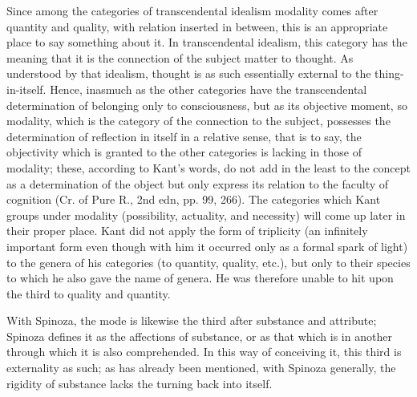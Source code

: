 Since among the categories of transcendental idealism
modality comes after quantity and quality,
with relation inserted in between,
this is an appropriate place to say something about it.
In transcendental idealism, this category has the meaning that
it is the connection of the subject matter to thought.
As understood by that idealism, thought is as such
essentially external to the thing-in-itself.
Hence, inasmuch as the other categories have
the transcendental determination of
belonging only to consciousness,
but as its objective moment,
so modality, which is the category of
the connection to the subject,
possesses the determination of
reflection in itself in a relative sense,
that is to say, the objectivity
which is granted to the other categories
is lacking in those of modality;
these, according to Kant's words,
do not add in the least to the concept
as a determination of the object
but only express its relation to the faculty of cognition
(Cr. of Pure R., 2nd edn, pp. 99, 266).
The categories which Kant groups under modality
(possibility, actuality, and necessity)
will come up later in their proper place.
Kant did not apply the form of triplicity
(an infinitely important form even though with him
it occurred only as a formal spark of light)
to the genera of his categories (to quantity, quality, etc.),
but only to their species to which he also gave the name of genera.
He was therefore unable to hit upon the third to quality and quantity.

With Spinoza, the mode is likewise the third after substance and attribute;
Spinoza defines it as the affections of substance,
or as that which is in another through which it is also comprehended.
In this way of conceiving it, this third is externality as such;
as has already been mentioned, with Spinoza generally,
the rigidity of substance lacks the turning back into itself.

